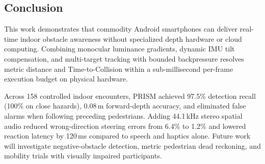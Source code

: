 \subsection{Conclusion}
\label{sec:conclusion}
This work demonstrates that commodity Android smartphones can deliver real-time indoor obstacle awareness without specialized depth hardware or cloud computing. Combining monocular luminance gradients, dynamic IMU tilt compensation, and multi-target tracking with bounded backpressure resolves metric distance and Time-to-Collision within a sub-millisecond per-frame execution budget on physical hardware.

Across 158 controlled indoor encounters, PRISM achieved 97.5\% detection recall (100\% on close hazards), 0.08\,m forward-depth accuracy, and eliminated false alarms when following preceding pedestrians. Adding 44.1\,kHz stereo spatial audio reduced wrong-direction steering errors from 6.4\% to 1.2\% and lowered reaction latency by 120\,ms compared to speech and haptics alone. Future work will investigate negative-obstacle detection, metric pedestrian dead reckoning, and mobility trials with visually impaired participants.
